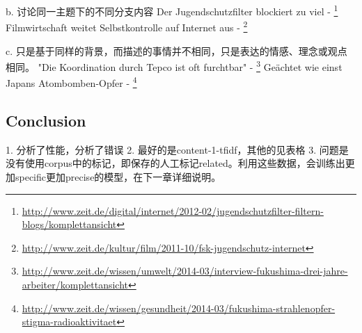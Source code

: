 b. 讨论同一主题下的不同分支内容
Der Jugendschutzfilter blockiert zu viel - \footnote{\url{http://www.zeit.de/digital/internet/2012-02/jugendschutzfilter-filtern-blogs/komplettansicht}}
Filmwirtschaft weitet Selbstkontrolle auf Internet aus - \footnote{\url{http://www.zeit.de/kultur/film/2011-10/fsk-jugendschutz-internet}}

c. 只是基于同样的背景，而描述的事情并不相同，只是表达的情感、理念或观点相同。
"Die Koordination durch Tepco ist oft furchtbar" - \footnote{\url{http://www.zeit.de/wissen/umwelt/2014-03/interview-fukushima-drei-jahre-arbeiter/komplettansicht}}
Geächtet wie einst Japans Atombomben-Opfer - \footnote{\url{http://www.zeit.de/wissen/gesundheit/2014-03/fukushima-strahlenopfer-stigma-radioaktivitaet}}
\subsection{Conclusion}
\label{sec:5.6}
1. 分析了性能，分析了错误
2. 最好的是content-1-tfidf，其他的见表格
3. 问题是没有使用corpus中的标记，即保存的人工标记related。利用这些数据，会训练出更加specific更加precise的模型，在下一章详细说明。
